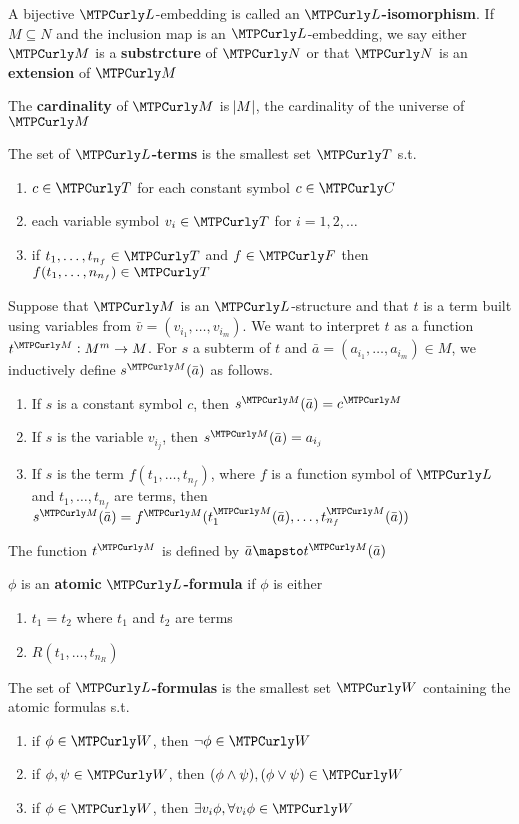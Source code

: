 \documentclass[11pt]{article}
\begin{document}
A bijective \(\call\)-embedding is called an \textbf{\(\call\)-isomorphism}. If
\(M\subseteq N\) and the inclusion map is an \(\call\)-embedding, we say either
\(\calm\) is a \textbf{substrcture} of \(\caln\) or that \(\caln\) is an \textbf{extension}
of \(\calm\)

The \textbf{cardinality} of \(\calm\) is \(\abs{M}\), the cardinality of the universe of \(\calm\)

\begin{definition}[]
The set of \textbf{\(\call\)-terms} is the smallest set \(\calt\) s.t.
\begin{enumerate}
\item \(c\in\calt\) for each constant symbol \(c\in\calc\)
\item each variable symbol \(v_i\in\calt\) for \(i=1,2,\dots\)
\item if \(t_1,\dots,t_{n_f}\in\calt\) and \(f\in\calf\) then
\(f(t_1,\dots,n_{n_f})\in\calt\)
\end{enumerate}
\end{definition}


Suppose that \(\calm\) is an \(\call\)-structure and that \(t\) is a term built
using variables from \(\bar{v}=(v_{i_1},\dots,v_{i_m})\). We want to interpret
\(t\) as a function \(t^\calm:M^m\to M\). For \(s\) a subterm of \(t\) and
\(\bar{a}=(a_{i_1},\dots,a_{i_m})\in M\), we inductively define
\(s^\calm(\bar{a})\) as follows.
\begin{enumerate}
\item If \(s\) is a constant symbol \(c\), then \(s^\calm(\bar{a})=c^\calm\)
\item If \(s\) is the variable \(v_{i_j}\), then \(s^\calm(\bar{a})=a_{i_j}\)
\item If \(s\) is the term \(f(t_1,\dots,t_{n_f})\), where \(f\) is a function symbol
of \(\call\) and \(t_1,\dots,t_{n_f}\) are terms, then 
\(s^\calm(\bar{a})=f^\calm(t^\calm_1(\bar{a}),\dots,t_{n_f}^\calm(\bar{a}))\)
\end{enumerate}


The function \(t^\calm\) is defined by \(\bar{a}\mapsto t^\calm(\bar{a})\)

\begin{definition}[]
\(\phi\) is an \textbf{atomic} \textbf{\(\call\)-formula} if \(\phi\) is either
\begin{enumerate}
\item \(t_1=t_2\) where \(t_1\) and \(t_2\) are terms
\item \(R(t_1,\dots,t_{n_R})\)
\end{enumerate}


The set of \textbf{\(\call\)-formulas} is the smallest set \(\calw\) containing the
atomic formulas s.t.
\begin{enumerate}
\item if \(\phi\in\calw\), then \(\neg\phi\in\calw\)
\item if \(\phi,\psi\in\calw\), then \((\phi\wedge\psi),(\phi\vee\psi)\in\calw\)
\item if \(\phi\in\calw\), then \(\exists v_i\phi,\forall v_i\phi\in\calw\)
\end{enumerate}
\end{definition}
\end{document}
